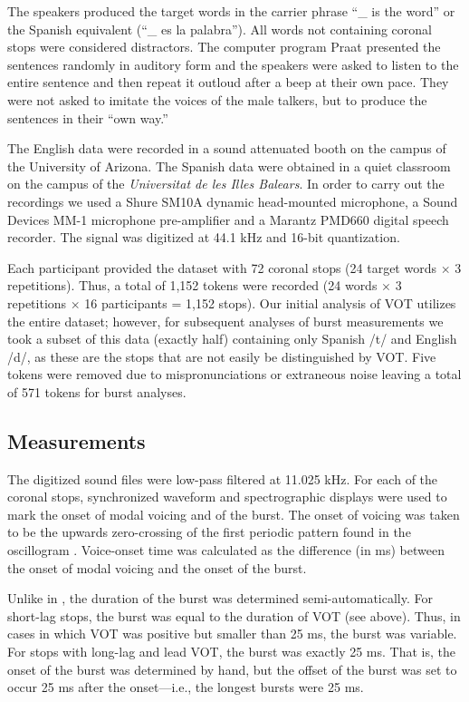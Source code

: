 \documentclass[a4paper,11pt,twocolumn]{article}
\begin{document}
The speakers produced the target words in the carrier phrase ``\_ is the word'' or the Spanish equivalent (``\_ es la palabra''). All words not containing coronal stops were considered distractors. The computer program Praat \cite{Praat} presented the sentences randomly in auditory form and the speakers were asked to listen to the entire sentence and then repeat it outloud after a beep at their own pace. They were not asked to imitate the voices of the male talkers, but to produce the sentences in their ``own way.''

The English data were recorded in a sound attenuated booth on the campus of the University of Arizona. The Spanish data were obtained in a quiet classroom on the campus of the \textit{Universitat de les Illes Balears}. In order to carry out the recordings we used a Shure SM10A dynamic head-mounted microphone, a Sound Devices MM-1 microphone pre-amplifier and a Marantz PMD660 digital speech recorder. The signal was digitized at 44.1 kHz and 16-bit quantization.

Each participant provided the dataset with 72 coronal stops (24 target words $\times$ 3 repetitions). Thus, a total of 1,152 tokens were recorded (24 words $\times$ 3 repetitions $\times$ 16 participants = 1,152 stops). Our initial analysis of VOT utilizes the entire dataset; however, for subsequent analyses of burst measurements we took a subset of this data (exactly half) containing only Spanish /t/ and English /d/, as these are the stops that are not easily be distinguished by VOT. Five tokens were removed due to mispronunciations or extraneous noise leaving a total of 571 tokens for burst analyses.

\subsection{Measurements}

The digitized sound files were low-pass filtered at 11.025 kHz. For each of the coronal stops, synchronized waveform and spectrographic displays were used to mark the onset of modal voicing and of the burst. The onset of voicing was taken to be the upwards zero-crossing of the first periodic pattern found in the oscillogram \cite{lieberman1988speech}. Voice-onset time was calculated as the difference (in ms) between the onset of modal voicing and the onset of the burst.

Unlike in \cite{sundara2005acoustic}, the duration of the burst was determined semi-automatically. For short-lag stops, the burst was equal to the duration of VOT (see above). Thus, in cases in which VOT was positive but smaller than 25 ms, the burst was variable. For stops with long-lag and lead VOT, the burst was exactly 25 ms. That is, the onset of the burst was determined by hand, but the offset of the burst was set to occur 25 ms after the onset---i.e., the longest bursts were 25 ms.
\end{document}
